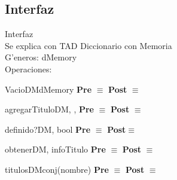 	
\subsection{Interfaz}
	Interfaz \\
	Se explica con TAD Diccionario con Memoria\\
	G'{e}neros: dMemory\\
	Operaciones:\\
	
	\begin{interfaz}{VacioDM}{}{dMemory}{}
	\textbf{Pre} $\equiv$ 
	\textbf{Post} $\equiv$ 
	\end{interfaz}
	
	\begin{interfaz}{agregarTituloDM}{, , }{}{}
	\textbf{Pre} $\equiv$ 
	\textbf{Post} $\equiv$ 
	\end{interfaz}
	
	\begin{interfaz}{definido?DM}{, }{bool}{}
	\textbf{Pre} $\equiv$ 
	\textbf{Post}$\equiv$ 
	\end{interfaz}
		
	\begin{interfaz}{obtenerDM}{, }{infoTitulo}{}
	\textbf{Pre} $\equiv$ 
	\textbf{Post} $\equiv$ 
	\end{interfaz}	
		
	\begin{interfaz}{titulosDM}{}{conj(nombre)}{}
	\textbf{Pre} $\equiv$ 
	\textbf{Post} $\equiv$ 
	\end{interfaz}	

